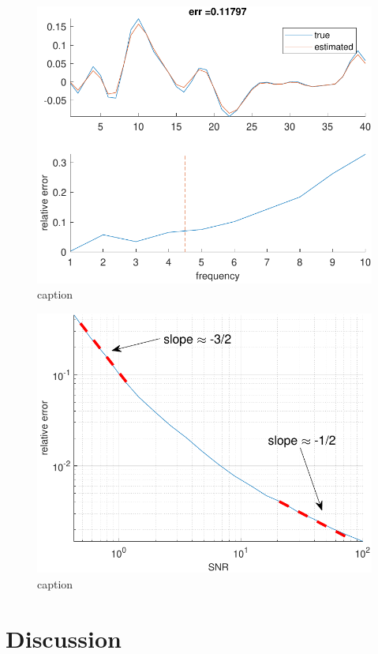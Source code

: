 \documentclass[english,12pt]{article}
\numberwithin{equation}{section}
\numberwithin{thm}{section} %
\begin{document}
\begin{figure}[h]
	\centering
	\includegraphics[scale=1]{XP2}
	\caption{\label{fig:XP2} caption}	
\end{figure}


\begin{figure}[h]
	\centering
	  \includegraphics[scale=1]{XP1}
	  \caption{\label{fig:XP1} caption}	
\end{figure}



\section{Discussion} \label{sec:future_work}
\end{document}

